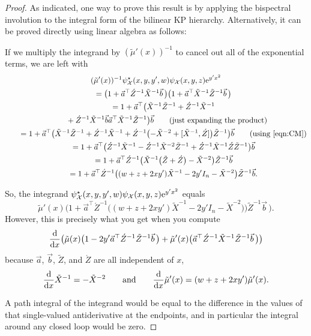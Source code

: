 \documentclass[10pt,a4paper]{amsart}
\numberwithin{equation}{section}
\theoremstyle{definition}
\def\psistar{\psi^{\star}}
\def\X{\mathcal{X}}
\begin{document}
\begin{proof}
As indicated, one way to prove this result is by applying the
bispectral involution to the integral form of the bilinear KP
hierarchy. Alternatively, it can be proved directly using linear
algebra as follows:

 If we multiply the integrand by
$(\tilde \mu'(x))^{-1}$ to cancel out all of the exponential
terms, we are left with
\begin{gather*}
 (\tilde \mu'(x))^{-1}\psistar_{\X}(x,y,y',w) \psi_{\X}(x,y,z){\rm e}^{y'
 x^2}\\
 \qquad = \bigl(1+\vec a^{\top}\acute Z^{-1}\tilde
 X^{-1}\vec b\,\bigr)\bigl(1+\vec a^{\top}\tilde X^{-1}\tilde
 Z^{-1}\vec b\,\bigr)\\
\qquad = 1+\vec a^{\top}\bigl(\tilde X^{-1}\tilde Z^{-1}+\acute Z^{-1}\tilde
 X^{-1}\\
 \phantom{\qquad =}{}
 +\acute Z^{-1}\tilde X^{-1}\vec b\vec a^{\top}\tilde X^{-1}\tilde
 Z^{-1}\bigr)\vec b\qquad\hbox{(just expanding the product)}\\
\qquad = 1+\vec a^{\top}\bigl(\tilde X^{-1}\tilde Z^{-1}+\acute Z^{-1}\tilde
 X^{-1}+\acute Z^{-1}\bigl(-\tilde X^{-2}+[\tilde X^{-1},\acute Z]\bigr)\tilde
 Z^{-1}\bigr)\vec b\qquad\hbox{(using \eqref{eqn:CM})}\\
\qquad = 1 +\vec a^{\top}\bigl(\acute Z^{-1}\tilde X^{-1}-\acute Z^{-1} \tilde
 X^{-2}\tilde Z^{-1}+\acute Z^{-1}\tilde X^{-1}\acute Z\tilde
 Z^{-1}\bigr)\vec b\\
 \qquad = 1 +\vec a^{\top}\acute Z^{-1}\bigl(\tilde X^{-1}\bigl(\tilde Z+\acute
 Z\bigr)-\tilde X^{-2}\bigr)\tilde Z^{-1}\vec b\\
\qquad = 1+ \vec a^{\top}\acute Z^{-1}\bigl((w+z+2xy')\tilde X^{-1}-2y' I_n-\tilde
 X^{-2}\bigr)\tilde Z^{-1}\vec b.
\end{gather*}

\noindent So, the integrand $\psistar_{\X}(x,y,y',w) \psi_{\X}(x,y,z){\rm e}^{y'
 x^2}$ equals
\[
\tilde\mu'(x)\bigl(1+ \vec a^{\top}\acute Z^{-1}\bigl((w+z+2xy')\tilde X^{-1}-2y' I_n-\tilde
X^{-2}\bigr)\bigr)\tilde Z^{-1}\vec b\,\bigr).
\]
However, this is precisely what you get when you compute
\[
\frac{\rm d}{{\rm d}x}\bigl(\tilde\mu(x)\bigl(1-2y'\vec a^{\top}\acute Z^{-1}\tilde
 Z^{-1}\vec b\,\bigr)+\tilde\mu'(x)\bigl(\vec a^{\top}\acute Z^{-1}
 \tilde X^{-1}\tilde Z^{-1}\vec b\,\bigr)\bigr)
\]
because
$\vec a$, $\vec b$, $\tilde Z$, and $\acute Z$ are all independent of $x$,
\[
\frac{\rm d}{{\rm d}x}\tilde X^{-1}=-\tilde X^{-2} \qquad \text{and}\qquad
\frac{\rm d}{{\rm d}x}\tilde \mu'(x)=(w+z+2xy')\tilde \mu'(x).
\]

A path integral of the integrand would be equal to the difference in
the values of that single-valued antiderivative at the endpoints, and in particular
the integral around any closed loop would be zero.
\end{proof}
\end{document}
